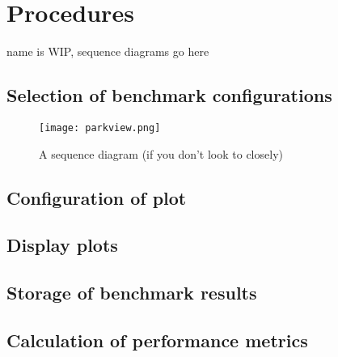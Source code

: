 \section{Procedures}

name is WIP, sequence diagrams go here

\subsection{Selection of benchmark configurations}

\begin{figure}[h]
  \centering
  \texttt{[image: parkview.png]}
  \caption{A sequence diagram (if you don't look to closely)}
\end{figure}

\subsection{Configuration of plot}

\subsection{Display plots}

\subsection{Storage of benchmark results}

\subsection{Calculation of performance metrics}
